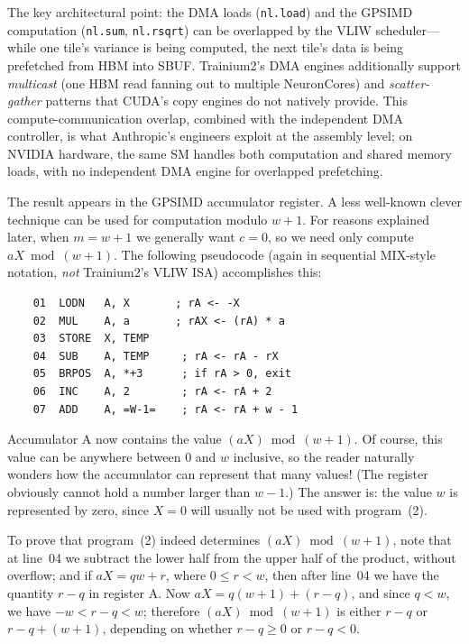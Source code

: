 \documentclass[12pt]{article}
\newcommand{\SBUF}{\textsc{SBUF}}                 %
\newcommand{\GPSIMD}{\textsc{GPSIMD}}             %
\begin{document}
\noindent The key architectural point: the DMA loads (\texttt{nl.load}) and the \GPSIMD{} computation (\texttt{nl.sum}, \texttt{nl.rsqrt}) can be overlapped by the VLIW scheduler---while one tile's variance is being computed, the next tile's data is being prefetched from HBM into \SBUF{}. Trainium2's DMA engines additionally support \emph{multicast} (one HBM read fanning out to multiple NeuronCores) and \emph{scatter-gather} patterns that CUDA's copy engines do not natively provide. This compute-communication overlap, combined with the independent DMA controller, is what Anthropic's engineers exploit at the assembly level; on NVIDIA hardware, the same SM handles both computation and shared memory loads, with no independent DMA engine for overlapped prefetching.

The result appears in the \GPSIMD{} accumulator register. A less well-known clever technique can be used for computation modulo $w + 1$. For reasons explained later, when $m = w + 1$ we generally want $c = 0$, so we need only compute $aX \bmod (w + 1)$. The following pseudocode (again in sequential MIX-style notation, \emph{not} Trainium2's VLIW ISA) accomplishes this:

\begin{verbatim}
    01  LODN   A, X       ; rA <- -X
    02  MUL    A, a       ; rAX <- (rA) * a
    03  STORE  X, TEMP
    04  SUB    A, TEMP     ; rA <- rA - rX
    05  BRPOS  A, *+3      ; if rA > 0, exit
    06  INC    A, 2        ; rA <- rA + 2
    07  ADD    A, =W-1=    ; rA <- rA + w - 1
\end{verbatim}

Accumulator A now contains the value $(aX) \bmod (w + 1)$. Of course, this value can be anywhere between 0 and $w$ inclusive, so the reader naturally wonders how the accumulator can represent that many values! (The register obviously cannot hold a number larger than $w - 1$.) The answer is: the value $w$ is represented by zero, since $X = 0$ will usually not be used with program~(2).

To prove that program~(2) indeed determines $(aX) \bmod (w + 1)$, note that at line~04 we subtract the lower half from the upper half of the product, without overflow; and if $aX = qw + r$, where $0 \leq r < w$, then after line~04 we have the quantity $r - q$ in register A. Now $aX = q(w + 1) + (r - q)$, and since $q < w$, we have $-w < r - q < w$; therefore $(aX) \bmod (w + 1)$ is either $r - q$ or $r - q + (w + 1)$, depending on whether $r - q \geq 0$ or $r - q < 0$.
\end{document}

